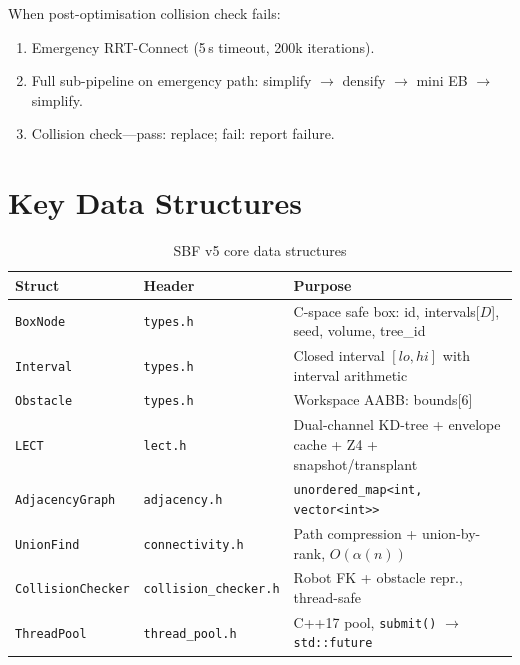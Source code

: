 \documentclass[journal]{IEEEtran}
\begin{document}
When post-optimisation collision check fails:
\begin{enumerate}[nosep]
  \item Emergency RRT-Connect (5\,s timeout, 200k iterations).
  \item Full sub-pipeline on emergency path: simplify $\to$ densify
    $\to$ mini EB $\to$ simplify.
  \item Collision check---pass: replace; fail: report failure.
\end{enumerate}

\section{Key Data Structures}\label{sec:datastruct}

\begin{table}[ht]
\centering
\caption{SBF v5 core data structures}
\label{tab:datastruct}
\begin{tabularx}{\columnwidth}{@{}llX@{}}
\toprule
\textbf{Struct} & \textbf{Header} & \textbf{Purpose} \\
\midrule
\texttt{BoxNode} & \texttt{types.h} & C-space safe box: id,
  intervals[$D$], seed, volume, tree\_id \\
\texttt{Interval} & \texttt{types.h} & Closed interval $[lo, hi]$
  with interval arithmetic \\
\texttt{Obstacle} & \texttt{types.h} & Workspace AABB: bounds[6] \\
\texttt{LECT} & \texttt{lect.h} & Dual-channel KD-tree +
  envelope cache + Z4 + snapshot/transplant \\
\texttt{AdjacencyGraph} & \texttt{adjacency.h}
  & \texttt{unordered\_map<int, vector<int>>} \\
\texttt{UnionFind} & \texttt{connectivity.h} & Path compression +
  union-by-rank, $O(\alpha(n))$ \\
\texttt{CollisionChecker} & \texttt{collision\_checker.h}
  & Robot FK + obstacle repr., thread-safe \\
\texttt{ThreadPool} & \texttt{thread\_pool.h} & C++17 pool,
  \texttt{submit()} $\to$ \texttt{std::future} \\
\bottomrule
\end{tabularx}
\end{table}

\end{document}
